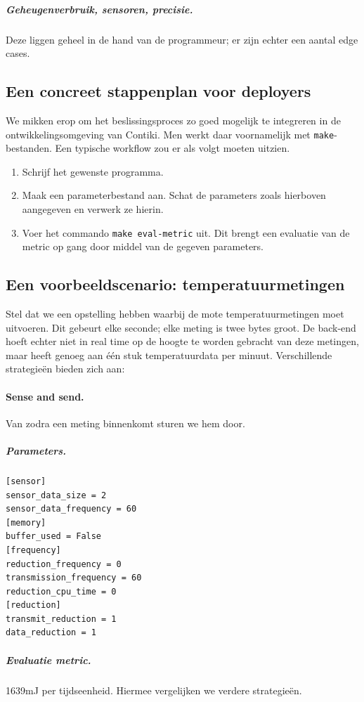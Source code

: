 \documentclass[11pt]{article}
\begin{document}
\subparagraph{Geheugenverbruik, sensoren, precisie.} Deze liggen geheel in de
hand van de programmeur; er zijn echter een aantal edge cases. 

\subsection{Een concreet stappenplan voor deployers}
We mikken erop om het beslissingsproces zo goed mogelijk te integreren in
de ontwikkelingsomgeving van Contiki. Men werkt daar voornamelijk met
\texttt{make}-bestanden. Een typische workflow zou er als volgt moeten uitzien.

\begin{enumerate}
\item Schrijf het gewenste programma.
\item Maak een parameterbestand aan. Schat de parameters zoals hierboven
aangegeven en verwerk ze hierin.
\item Voer het commando \texttt{make eval-metric} uit. Dit brengt een evaluatie
van de metric op gang door middel van de gegeven parameters.
\end{enumerate}

\subsection{Een voorbeeldscenario: temperatuurmetingen}

Stel dat we een opstelling hebben waarbij de mote temperatuurmetingen moet
uitvoeren. Dit gebeurt elke seconde; elke meting is twee bytes groot. De
back-end hoeft echter niet in real time op de hoogte te worden gebracht van deze
metingen, maar heeft genoeg aan \'e\'en stuk temperatuurdata per
minuut. Verschillende strategie\"en bieden zich aan:

\paragraph{Sense and send.} Van zodra een meting binnenkomt sturen we hem door.

\subparagraph{Parameters.} 

\begin{verbatim}
[sensor]
sensor_data_size = 2
sensor_data_frequency = 60
[memory]
buffer_used = False
[frequency]
reduction_frequency = 0
transmission_frequency = 60
reduction_cpu_time = 0
[reduction]
transmit_reduction = 1
data_reduction = 1
\end{verbatim}

\subparagraph{Evaluatie metric.} 1639mJ per tijdseenheid. Hiermee vergelijken we verdere strategie\"en.
\end{document}
